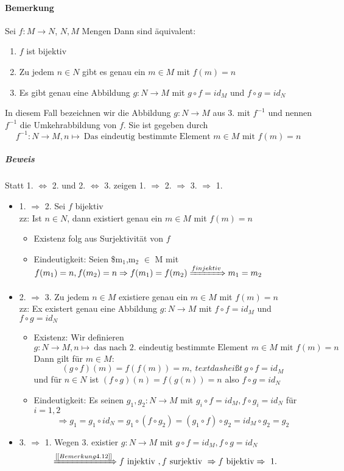 \documentclass[a4paper]{scrartcl}
\begin{document}
\paragraph{Bemerkung}
\label{sec-2-6-7-6}
Sei $f:M\to N$, $N,M$ Mengen
Dann sind äquivalent:
\begin{enumerate}
\item $f$ ist bijektiv
\item Zu jedem $n\in N$ gibt es genau ein $m\in M$ mit $f(m) = n$
\item Es gibt genau eine Abbildung $g:N\to M$ mit $g\circ f = id_M$ und $f\circ g = id_N$
\end{enumerate}
In diesem Fall bezeichnen wir die Abbildung $g:N\to M$ aus 3. mit $f^{-1}$ und nennen $f^{-1}$ die Umkehrabbildung von $f$. Sie ist gegeben durch
\[f^{-1} : N\to M, n\mapsto~\text{Das eindeutig bestimmte Element $m\in M$ mit $f(m) = n$}\]
\subparagraph{Beweis}
\label{sec-2-6-7-6-1}
Statt 1. $\Leftrightarrow$ 2. und 2. $\Leftrightarrow$ 3. zeigen 1. $\Rightarrow$ 2. $\Rightarrow$ 3. $\Rightarrow$ 1.
\begin{itemize}
\item 1. $\Rightarrow$ 2. Sei $f$ bijektiv \\
        zz: Ist $n\in N$, dann existiert genau ein $m\in M$ mit $f(m) = n$ \\
\begin{itemize}
\item Existenz folg aus Surjektivität von $f$
\item Eindeutigkeit: Seien \$m$_{\text{1}}$,m$_{\text{2}}$ $\in$ M  mit \(f(m_1) = n, f(m_2) = n \Rightarrow f(m_1) = f(m_2) \xRightarrow{f injektiv} m_1 = m_2\)
\end{itemize}
\item 2. $\Rightarrow$ 3. Zu jedem $n\in M$ existiere genau ein $m\in M$ mit $f(m) = n$ \\
        zz: Ex existert genau eine Abbildung $g:N\to M$ mit $f\circ f = id_M$ und $f\circ g = id_N$
\begin{itemize}
\item Existenz: Wir definieren \(g:N\to M, n\mapsto~\text{das nach 2. eindeutig bestimmte Element $m\in M$ mit $f(m) = n$}\) \\
          Dann gilt für $m\in M$: \[(g\circ f)(m) = f(f(m)) = m,~text{das heißt}~ g\circ f = id_M\]
          und für $n\in N$ ist $(f\circ g)(n) = f(g(n)) = n$ also $f\circ g = id_N$
\item Eindeutigkeit: Es seinen $g_1,g_2:N\to M$ mit $g_i \circ f = id_M, f\circ g_i = id_N$ für $i = 1,2$ \\
          \[\Rightarrow g_1 = g_1 \circ id_N = g_1 \circ (f\circ g_2) = (g_1 \circ f) \circ g_2 = id_M \circ g_2 = g_2\]
\end{itemize}
\item 3. $\Rightarrow$ 1. Wegen 3. existier $g:N\to M$ mit $g\circ f = id_M,f\circ g = id_N$ \\
        \[\xRightarrow{[[Bemerkung 4.12]]} f~\text{injektiv}~,f~\text{surjektiv}~\Rightarrow f~\text{bijektiv}\Rightarrow~\text{1.}\]
\end{itemize}
\end{document}
